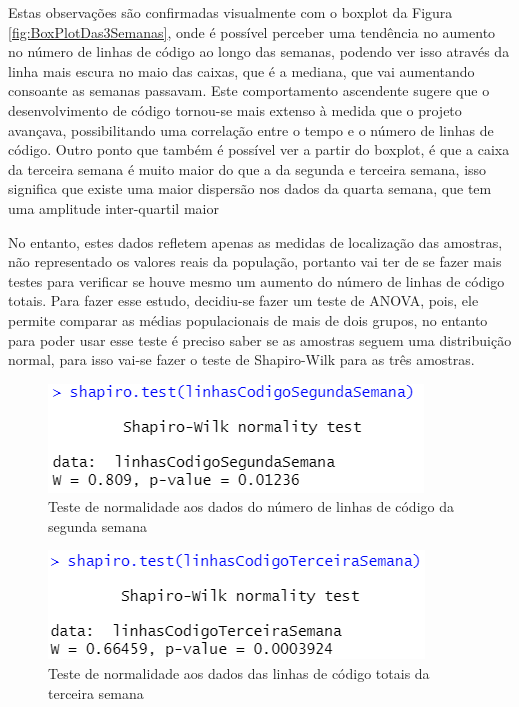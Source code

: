 \documentclass[%
 aip,
cp,  %
 amsmath,amssymb,%
 reprint,%
]{revtex4-2}
\begin{document}
Estas observações são confirmadas visualmente com o boxplot da Figura \ref {fig:BoxPlotDas3Semanas}, onde é possível perceber uma tendência no aumento no número de linhas de código ao longo das semanas, podendo ver isso através da linha mais escura no maio das caixas, que é a mediana, que vai aumentando consoante as semanas passavam. Este comportamento ascendente sugere que o desenvolvimento de código tornou-se mais extenso à medida que o projeto avançava, possibilitando uma correlação entre o tempo e o número de linhas de código. Outro ponto que também é possível ver a partir do boxplot, é que a caixa da terceira semana é muito maior do que a da segunda e terceira semana, isso significa que existe uma maior dispersão nos dados da quarta semana, que tem uma amplitude inter-quartil maior

No entanto, estes dados refletem apenas as medidas de localização das amostras, não representado os valores reais da população, portanto vai ter de se fazer mais testes para verificar se houve mesmo um aumento do número de linhas de código totais. Para fazer esse estudo, decidiu-se fazer um teste de ANOVA, pois, ele permite comparar as médias populacionais de mais de dois grupos, no entanto para poder usar esse teste é preciso saber se as amostras seguem uma distribuição normal, para isso vai-se fazer o teste de Shapiro-Wilk para as três amostras.

\begin{figure}[!h]
    \centering
    \includegraphics[width=0.6\linewidth]{imagens//questao2/testeShapiroLinhasSegundaSemana.png}
    \caption{Teste de normalidade aos dados do número de  linhas de código da segunda semana}
    \label{fig:shapiroTesteSemana2Linhas}
\end{figure}

\begin{figure}[!h]
    \centering
    \includegraphics[width=0.6\linewidth]{imagens//questao2/testeShapiroLinhasTerceiraSemana.png}
    \caption{Teste de normalidade aos dados das linhas de código totais da terceira semana}
    \label{fig:shapiroTesteSemana3Linhas}
\end{figure}
\end{document}
